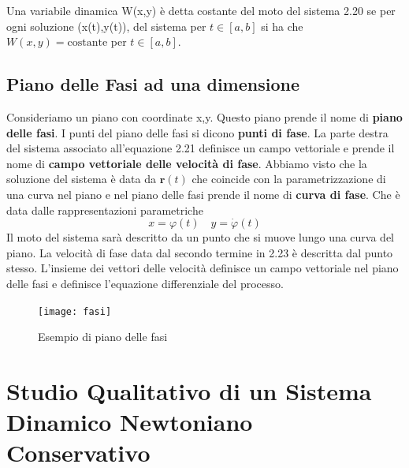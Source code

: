 \begin{definition}
	Una variabile dinamica W(x,y) \`{e} detta costante del moto del sistema 2.20 se per ogni soluzione (x(t),y(t)), del sistema per $t \in [a,b]$ si ha che $W(x,y) = \text{costante}$ per $t \in [a,b]$.
\end{definition}
\subsection{Piano delle Fasi ad una dimensione}
 Consideriamo un piano con coordinate x,y. Questo piano prende il nome di \textbf{piano delle fasi}. I punti del piano delle fasi si dicono \textbf{punti di fase}. La parte destra del sistema associato all'equazione 2.21 definisce un campo vettoriale e prende il nome di \textbf{campo vettoriale delle velocit\`{a} di fase}. Abbiamo visto che la soluzione del sistema \`{e} data da $\bm{r}(t)$ che coincide con la parametrizzazione di una curva nel piano e nel piano delle fasi prende il nome di \textbf{curva di fase}. Che \`{e} data dalle rappresentazioni parametriche 
\begin{equation}
	x = \varphi(t) \quad y = \dot{\varphi}(t)
\end{equation}
Il moto del sistema sar\`{a} descritto da un punto che si muove lungo una curva del piano. La velocit\`{a} di fase data dal secondo termine in 2.23 \`{e} descritta dal punto stesso. L'insieme dei vettori delle velocit\`{a} definisce un campo vettoriale nel piano delle fasi e definisce l'equazione differenziale del processo.
\newpage 
\begin{figure}[!ht]
\vspace{0.2in}
\texttt{[image: fasi]}	
\centering
\vspace{0.2in}
\caption{Esempio di piano delle fasi}
\end{figure}

\section{Studio Qualitativo di un Sistema Dinamico Newtoniano Conservativo }

